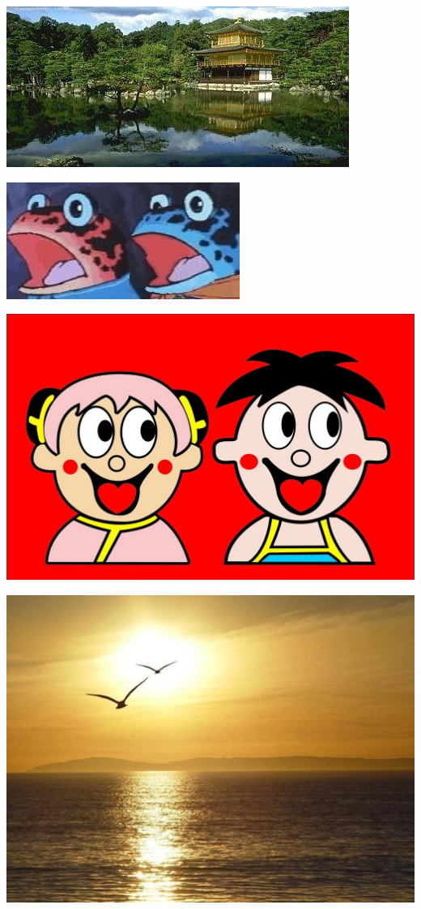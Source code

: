 \documentclass[10pt, a4paper]{article}
\begin{document}
    \includegraphics[scale = .3]{inputsobel.jpg}

    \includegraphics[scale = .3]{hhhsobel.jpg}

    \includegraphics[scale = .3]{666sobel.jpg}

    \includegraphics[scale = .3]{orisobel.jpg}
\end{document}
